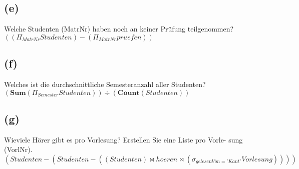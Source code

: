\documentclass{article}
\begin{document}
\subsection{(e)}
Welche Studenten (MatrNr) haben noch an keiner Prüfung teilgenommen?\\
$((\Pi_{MatrNr} Studenten) - (\Pi_{MatrNr} pruefen))$\\

\subsection{(f)}
Welches ist die durchschnittliche Semesteranzahl aller Studenten?\\
$(\textbf{Sum}(\Pi_{Semester} Studenten)) \div  (\textbf{Count}(Studenten))$\\

\subsection{(g)}
Wieviele Hörer gibt es pro Vorlesung? Erstellen Sie eine Liste pro Vorle-
sung (VorlNr).\\
$ (Studenten - (Studenten - ((Studenten) \bowtie hoeren \bowtie (\sigma_{gelesenVon='Kant'} Vorlesung))))$
\end{document}
